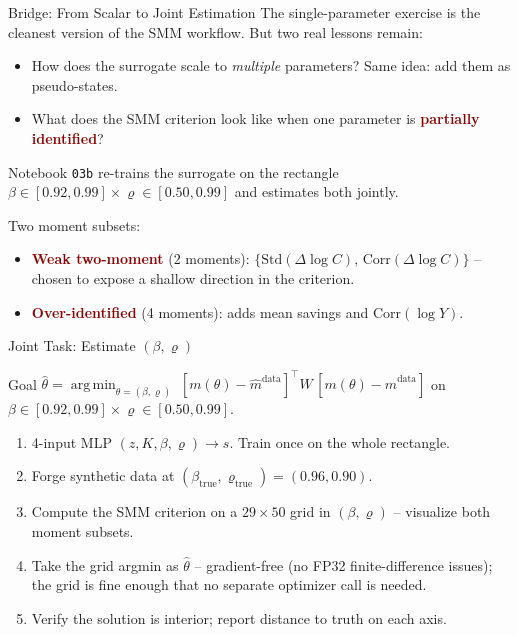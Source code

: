 \documentclass[10pt,aspectratio=169]{beamer}
\newcommand{\emphc}[1]{\textbf{\textcolor{darkred}{#1}}}
\DeclareMathOperator*{\argmin}{arg\,min}
\begin{document}
\begin{frame}{Bridge: From Scalar to Joint Estimation}
\small
The single-parameter exercise is the cleanest version of the SMM workflow. But two real lessons remain:
\begin{itemize}
\itemsep1pt
  \item How does the surrogate scale to \emph{multiple} parameters? Same idea: add them as pseudo-states.
  \item What does the SMM criterion look like when one parameter is \emphc{partially identified}?
\end{itemize}
\vspace{0.1cm}
Notebook \texttt{03b} re-trains the surrogate on the rectangle $\beta \in [0.92, 0.99] \times \varrho \in [0.50, 0.99]$ and estimates both jointly.

\vspace{0.2cm}
Two moment subsets:
\begin{itemize}
  \item \emphc{Weak two-moment} (2 moments): $\{\mathrm{Std}(\Delta\log C),\,\mathrm{Corr}(\Delta\log C)\}$ -- chosen to expose a shallow direction in the criterion.
  \item \emphc{Over-identified} (4 moments): adds mean savings and $\mathrm{Corr}(\log Y)$.
\end{itemize}
\end{frame}

\begin{frame}{Joint Task: Estimate $(\beta, \varrho)$}
\begin{block}{Goal}
$\hat\theta = \argmin_{\theta = (\beta,\varrho)}\; [m(\theta) - \hat{m}^{\mathrm{data}}]^\top W\, [m(\theta) - \hat{m}^{\mathrm{data}}]$ \quad on $\beta\in[0.92,0.99] \times \varrho\in[0.50, 0.99]$.
\end{block}
\begin{enumerate}
  \itemsep1pt
  \item 4-input MLP $(z, K, \beta, \varrho) \to s$. Train once on the whole rectangle.
  \item Forge synthetic data at $(\beta_{\text{true}}, \varrho_{\text{true}}) = (0.96, 0.90)$.
  \item Compute the SMM criterion on a $29\times 50$ grid in $(\beta, \varrho)$ -- visualize both moment subsets.
  \item Take the grid argmin as $\hat\theta$ -- gradient-free (no FP32 finite-difference issues); the grid is fine enough that no separate optimizer call is needed.
  \item Verify the solution is interior; report distance to truth on each axis.
\end{enumerate}
\end{frame}
\end{document}
